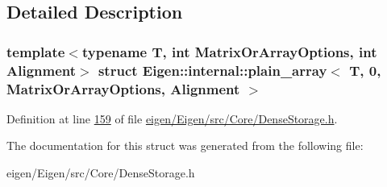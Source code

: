 \subsection{Detailed Description}
\subsubsection*{template$<$typename T, int Matrix\+Or\+Array\+Options, int Alignment$>$\newline
struct Eigen\+::internal\+::plain\+\_\+array$<$ T, 0, Matrix\+Or\+Array\+Options, Alignment $>$}



Definition at line \hyperlink{eigen_2_eigen_2src_2_core_2_dense_storage_8h_source_l00159}{159} of file \hyperlink{eigen_2_eigen_2src_2_core_2_dense_storage_8h_source}{eigen/\+Eigen/src/\+Core/\+Dense\+Storage.\+h}.



The documentation for this struct was generated from the following file\+:\begin{DoxyCompactItemize}
\item 
eigen/\+Eigen/src/\+Core/\+Dense\+Storage.\+h\end{DoxyCompactItemize}
